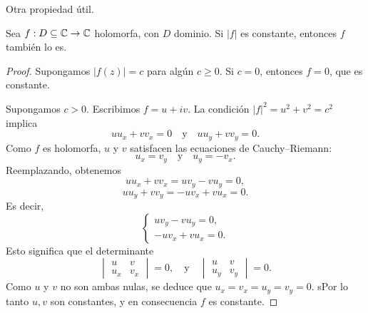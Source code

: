 Otra propiedad útil.

\begin{proposition}
    Sea $f : D \subseteq \mathbb{C} \to \mathbb{C}$ holomorfa, con $D$ dominio. 
    Si $|f|$ es constante, entonces $f$ también lo es.
\end{proposition}

\begin{proof}
    Supongamos $|f(z)| = c$ para algún $c \geq 0$.  
    Si $c = 0$, entonces $f = 0$, que es constante.  

    Supongamos $c > 0$. Escribimos $f = u + iv$. La condición $|f|^2 = u^2+v^2 = c^2$ implica
    \begin{equation*}
        u u_x + v v_x = 0
        \quad\text{y}\quad
        u u_y + v v_y = 0.
    \end{equation*}
    Como $f$ es holomorfa, $u$ y $v$ satisfacen las ecuaciones de Cauchy–Riemann:
    \begin{equation*}
        u_x = v_y \quad\text{y}\quad u_y = -v_x.
    \end{equation*}
    Reemplazando, obtenemos
    \begin{equation*}
        u u_x + v v_x = u v_y - v u_y = 0,
    \end{equation*}
    \begin{equation*}
        u u_y + v v_y = -u v_x + v u_x = 0.
    \end{equation*}
    Es decir,
    \begin{equation*}
        \begin{cases}
            u v_y - v u_y = 0, \\
            -u v_x + v u_x = 0.
        \end{cases}
    \end{equation*}
    Esto significa que el determinante
    \begin{equation*}
        \begin{vmatrix}
            u & v \\
            u_x & v_x
        \end{vmatrix}
        = 0,
        \quad\text{y}\quad
        \begin{vmatrix}
            u & v \\
            u_y & v_y
        \end{vmatrix}
        = 0.
    \end{equation*}
    Como $u$ y $v$ no son ambas nulas, se deduce que $u_x=v_x=u_y=v_y=0$. sPor lo tanto $u,v$ son constantes, y en consecuencia $f$ es constante.
\end{proof}


